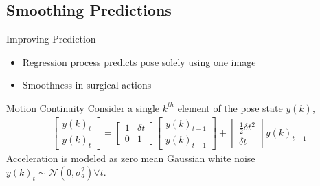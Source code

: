 \subsection[]{Smoothing Predictions}
\begin{frame}{Improving Prediction}
\begin{itemize}
\item Regression process predicts pose solely using one image
 \item Smoothness in surgical actions
\end{itemize}

\begin{block}{Motion Continuity}
 Consider a single $k^{th}$ element of the pose state $y(k)$, 
\begin{align}
\begin{bmatrix}
y(k)_{t}\\
\dot{y}(k)_{t}
\end{bmatrix}=
\begin{bmatrix}
1 & \delta t\\
0 & 1
\end{bmatrix}\begin{bmatrix}
y(k)_{t-1}\\
\dot{y}(k)_{t-1}
\end{bmatrix}+
\begin{bmatrix}
\frac{1}{2} \delta t^2 \\
\delta t
\end{bmatrix}\ddot{y}(k)_{t-1} \label{eq:state_prop}
\end{align}
Acceleration is modeled as zero mean Gaussian white noise $\ddot{y}(k)_t \sim \mathcal{N}(0,\sigma_a^2) \forall t $.
\end{block}
\end{frame}

